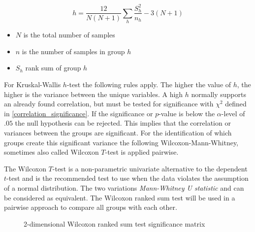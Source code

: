\smallskip
\begin{equation}
\label{formula_kruskal_wallis}	
	h = \frac{12}{N(N+1)}\sum_{h}{\frac{S_h^2}{n_h}}-3(N+1)
\end{equation}
\begin{itemize}
	\setlength\itemsep{0.1em}	
	\item[] $N$ is the total number of samples 
	\item[] $n$ is the number of samples in group $h$
	\item[] $S_h$ rank sum of group $h$
\end{itemize}

\medskip

For Kruskal-Wallis $h$-test the following rules apply. The higher the value of $h$, the higher is the variance between the unique variables. A high $h$ normally supports an already found correlation, but must be tested for significance with $\chi^2$ defined in \cref{correlation_significance}. If the significance or $p$-value is below the $\alpha$-level of $.05$ the null hypothesis can be rejected. This implies that the correlation or variances between the groups are significant. For the identification of which groups create this significant variance the following Wilcoxon-Mann-Whitney, sometimes also called Wilcoxon $T$-test is applied pairwise.

The Wilcoxon $T$-test is a non-parametric univariate alternative to the dependent $t$-test and is the recommended test to use when the data violates the assumption of a normal distribution. The two variations \textit{Mann-Whitney U statistic} and  can be considered as equivalent. The Wilcoxon ranked sum test will be used in a pairwise approach to compare all groups with each other. 
\begin{figure}[ht]
	\centering
  	\caption{2-dimensional Wilcoxon ranked sum test significance matrix}
\end{figure}

